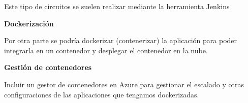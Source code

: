\documentclass[12pt]{report} %
\begin{document}
Este tipo de circuitos se suelen realizar mediante la herramienta Jenkins

\textbf{Dockerización}

Por otra parte se podría dockerizar (contenerizar) la aplicación para poder integrarla en un contenedor y desplegar el contenedor en la nube.

\textbf{Gestión de contenedores}

Incluir un gestor de contenedores en Azure para gestionar el escalado y otras configuraciones de las aplicaciones que tengamos dockerizadas.


\clearpage
{}
\printbibliography




\end{document}
